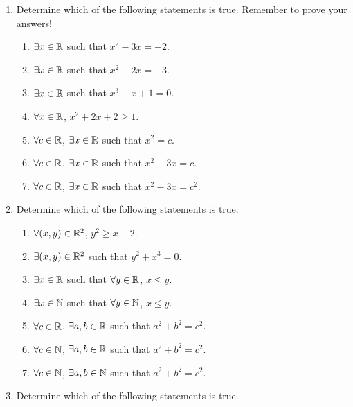 \probsec{~\ref{sec:quantifiers}}
\begin{enumerate}
    \item Determine which of the following statements is true. Remember to prove your answers! 
  \begin{enumerate}
      \item $\exists x \in \mathbb{R}$ such that $x^2 - 3x = -2$.
      \item $\exists x \in \mathbb{R}$ such that $x^2 - 2x = -3$.
      \item $\exists x \in \mathbb{R}$ such that $x^3 - x + 1 = 0$.
      \item $\forall x \in \mathbb{R}$, $x^2 + 2x + 2 \geq 1$.
      \item $\forall c \in \mathbb{R}$, $\exists x \in \mathbb{R}$ such that $x^2 = c$.
      \item $\forall c \in \mathbb{R}$, $\exists x \in \mathbb{R}$ such that $x^2 - 3x = c$.
      \item $\forall c \in \mathbb{R}$, $\exists x \in \mathbb{R}$ such that $x^2 - 3x = c^2$.
  \end{enumerate}
    \item Determine which of the following statements is true.
  \begin{enumerate}
      \item $\forall (x,y) \in \mathbb{R}^2$, $y^2 \geq x - 2$.
      \item $\exists (x,y) \in \mathbb{R}^2$ such that $y^2 + x^3 = 0$.
      \item $\exists x \in \mathbb{R}$ such that $\forall y \in \mathbb{R}$, $x \leq y$.
      \item $\exists x \in \mathbb{N}$ such that $\forall y \in \mathbb{N}$, $x \leq y$.
      \item $\forall c \in \mathbb{R}$, $\exists a, b \in \mathbb{R}$ such that $a^2 + b^2 = c^2$.
      \item $\forall c \in \mathbb{N}$, $\exists a, b \in \mathbb{R}$ such that $a^2 + b^2 = c^2$.
      \item $\forall c \in \mathbb{N}$, $\exists a, b \in \mathbb{N}$ such that $a^2 + b^2 = c^2$.
  \end{enumerate}
    \item Determine which of the following statements is true.

\end{enumerate}
